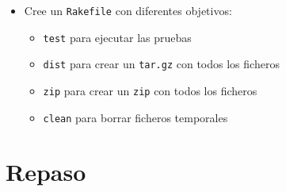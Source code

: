 \begin{itemize}
\begin{itemize}
  \end{itemize}

\item Cree un \verb|Rakefile| con diferentes objetivos:
  \begin{itemize}
  \item \verb|test| para ejecutar las pruebas
  \item \verb|dist| para crear un \verb|tar.gz| con todos los ficheros
  \item \verb|zip| para crear un \verb|zip| con todos los ficheros
  \item \verb|clean| para borrar ficheros temporales
  \end{itemize}
\end{itemize}

\section{Repaso}

